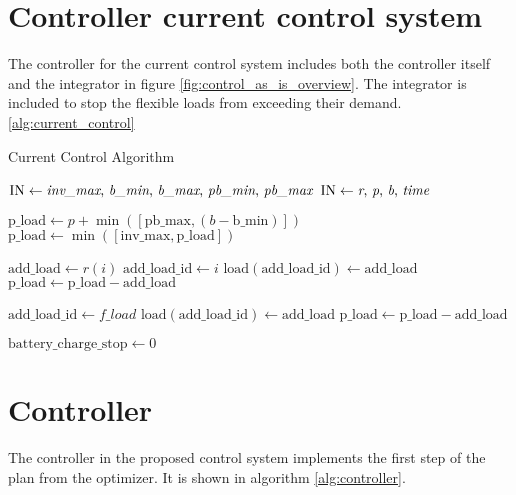 \section{Controller current control system}
The controller for the current control system includes both the controller itself and the integrator in figure \ref{fig:control_as_is_overview}. The integrator is included to stop the flexible loads from exceeding their demand. \ref{alg:current_control}

\begin{algorithm}
\caption{Current Control Algorithm}\label{alg:current_control}
    \begin{algorithmic}
        \State $\text{IN} \gets \text{\textit{inv\_max}, \textit{b\_min}, \textit{b\_max}, \textit{pb\_min}, \textit{pb\_max}}$ 
        \State $\text{IN} \gets \text{\textit{r}, \textit{p}, \textit{b}, \textit{time}}$       
    
        \State $\text{p\_load} \gets p + \min([\text{pb\_max}, (b - \text{b\_min})])$
        \State $\text{p\_load} \gets \min([\text{inv\_max}, \text{p\_load}])$
    
            \State $\text{add\_load} \gets r(i)$
            \State $\text{add\_load\_id} \gets i$
                \State $\text{load}(\text{add\_load\_id}) \gets \text{add\_load}$
                \State $\text{p\_load} \gets \text{p\_load} - \text{add\_load}$
            \EndIf
        \EndFor
    
                \State $\text{add\_load\_id} \gets f\_load$
                    \State $\text{load}(\text{add\_load\_id}) \gets \text{add\_load}$
                    \State $\text{p\_load} \gets \text{p\_load} - \text{add\_load}$
                \EndIf
            \EndIf
        \EndFor
        
            \State $\text{battery\_charge\_stop} \gets 0$
        \EndIf
    \end{algorithmic}
\end{algorithm}


\section{Controller}
The controller in the proposed control system implements the first step of the plan from the optimizer. It is shown in algorithm \ref{alg:controller}.